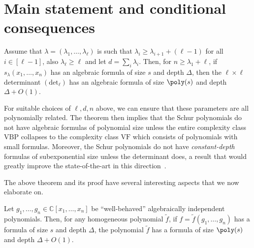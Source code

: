 \section*{Main statement and conditional consequences}
\setcounter{theorem}{2}
\begin{theorem}
\label{thm:main-intro}
Assume that $\lambda= (\lambda_1,\ldots,\lambda_\ell)$ is such that $\lambda_i \geq \lambda_{i+1}+(\ell-1)$ for all $i \in [\ell-1]$, also $\lambda_{\ell} \geq \ell$ and let $d = \sum_i \lambda_i$. Then, for $n \geq \lambda_1 + \ell$, if $s_\lambda(x_1,\ldots,x_n)$ has an algebraic formula of size $s$ and depth $\Delta$, then the $\ell\times \ell$ determinant $(\mathrm{det}_\ell )$ has an algebraic formula of size $\poly(s)$ and depth $\Delta + O(1).$
\end{theorem}

For suitable choices of $\ell,d,n$ above, we can ensure that these parameters are all polynomially related. The theorem then implies that the Schur polynomials do not have algebraic formulas of polynomial size unless the entire complexity class $\mathrm{VBP}$ collapses to the complexity class $\mathrm{VF}$ which consists of polynomials with small formulas. Moreover, the Schur polynomials do not have  \emph{constant-depth} formulas of subexponential size unless the determinant does, a result that would greatly improve the state-of-the-art in this direction~\cite{r16}. 

The above theorem and its proof have several interesting aspects that we now elaborate on. 

\begin{lemma}\label{lem:key-intro}
Let $g_1,\ldots,g_n\in \mathbb{C}[x_1,\ldots,x_n]$ be ``well-behaved'' algebraically independent polynomials. Then, for any homogeneous polynomial $\tilde{f}$, if $f = \tilde{f}(g_1,\ldots,g_n)$ has a formula of size $s$ and depth $\Delta$, the polynomial $\tilde{f}$ has a formula of size $\poly(s)$ and depth $\Delta + O(1).$
\end{lemma}
